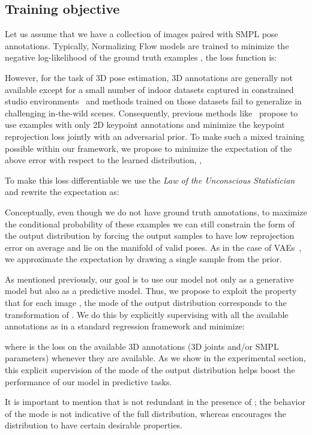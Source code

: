 \subsection{Training objective}
Let us assume that we have a collection of images paired with SMPL pose annotations. Typically, Normalizing Flow models are trained to minimize the negative log-likelihood of the ground truth examples , \ie the loss function is:


However, for the task of 3D pose estimation, 3D annotations are generally not available except for a small number of indoor datasets captured in constrained studio environments~\cite{ionescu2014human3, mehta2017monocular} and methods trained on those datasets fail to generalize in challenging in-the-wild scenes. Consequently, previous methods like~\cite{kanazawa2018end} propose to use examples with only 2D keypoint annotations and minimize the keypoint reprojection loss jointly with an adversarial prior. To make such a mixed training possible within our framework, we propose to minimize the expectation of the above error with respect to the learned distribution, \ie,

To make this loss differentiable we use the \emph{Law of the Unconscious Statistician} and rewrite the expectation as:


Conceptually, even though we do not have ground truth annotations, to maximize the conditional probability of these examples we can still constrain the form of the output distribution by forcing the output samples to have low reprojection error on average and lie on the manifold of valid poses. As in the case of VAEs~\cite{kingma2014auto}, we approximate the expectation by drawing a single sample from the prior.

As mentioned previously, our goal is to use our model not only as a generative model but also as a predictive model. Thus, we propose to exploit the property that for each image , the mode  of the output distribution corresponds to the transformation of . We do this by explicitly supervising  with all the available annotations as in a standard regression framework and minimize:

where  is the loss on the available 3D annotations (3D joints and/or SMPL parameters) whenever they are available. As we show in the experimental section, this explicit supervision of the mode of the output distribution helps boost the performance of our model in predictive tasks.

It is important to mention that  is not redundant in the presence of ; the behavior of the mode is not indicative of the full distribution, whereas  encourages the distribution to have certain desirable properties.

